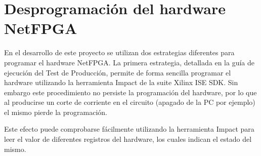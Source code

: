


\section{Desprogramaci\'on del hardware NetFPGA}
\label{apendiceB2}

En el desarrollo de este proyecto se utilizan dos estrategias diferentes para programar el hardware NetFPGA. La primera estrategia, detallada en la guía de ejecución del Test de Producción\citep{ProdTestManual}, permite de forma sencilla programar el hardware utilizando la herramienta Impact de la suite Xilinx ISE SDK. Sin embargo este procedimiento no persiste la programaci\'on del hardware, por lo que al producirse un corte de corriente en el circuito (apagado de la PC por ejemplo) el mismo pierde la programaci\'on.

Este efecto puede comprobarse fácilmente utilizando la herramienta Impact para leer el valor de diferentes registros del hardware, los cuales indican el estado del mismo.\\



